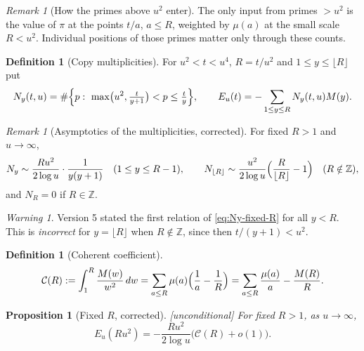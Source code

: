 \documentclass[11pt]{amsart}
\numberwithin{equation}{section}
\theoremstyle{plain}
\newtheorem{proposition}[theorem]{Proposition}
\theoremstyle{definition}
\newtheorem{definition}[theorem]{Definition}
\theoremstyle{remark}
\newtheorem{remark}[theorem]{Remark}
\newtheorem{warning}[theorem]{Warning}
\newcommand{\Cc}{\mathcal{C}}
\begin{document}
\begin{remark}[How the primes above $u^2$ enter]
\label{rem:unknown_primes_enter}
The only input from primes $>u^2$ is the value of $\pi$ at the points $t/a$,
$a\le R$, weighted by $\mu(a)$ at the small scale $R<u^2$. Individual
positions of those primes matter only through these counts.
\end{remark}

\begin{definition}[Copy multiplicities]
\label{def:copy-multiplicity}
For $u^2<t<u^4$, $R=t/u^2$ and $1\le y\le\lfloor R\rfloor$ put
\begin{equation}
\label{eq:Ny-exact}
  N_y(t,u)=\#\Bigl\{p:\ \max\bigl(u^2,\tfrac{t}{y+1}\bigr)<p\le\tfrac ty\Bigr\},
  \qquad
  E_u(t)=-\sum_{1\le y\le R}N_y(t,u)M(y).
\end{equation}
\end{definition}

\begin{remark}[Asymptotics of the multiplicities, corrected]
\label{rem:copy-count-asymptotic}
For fixed $R>1$ and $u\to\infty$,
\begin{equation}
\label{eq:Ny-fixed-R}
  N_y\sim\frac{Ru^2}{2\log u}\cdot\frac1{y(y+1)}\quad(1\le y\le R-1),
  \qquad
  N_{\lfloor R\rfloor}\sim\frac{u^2}{2\log u}\Bigl(\frac R{\lfloor R\rfloor}-1\Bigr)
  \quad(R\notin\mathbb{Z}),
\end{equation}
and $N_R=0$ if $R\in\mathbb{Z}$.
\end{remark}

\begin{warning}
\label{warn:v5_Ny}
Version 5 stated the first relation of \eqref{eq:Ny-fixed-R} for all $y<R$.
This is \emph{incorrect} for $y=\lfloor R\rfloor$ when $R\notin\mathbb{Z}$,
since then $t/(y+1)<u^2$.
\end{warning}

\begin{definition}[Coherent coefficient]
\label{def:coherent_coefficient}
\begin{equation}
\label{eq:C_def}
  \Cc(R):=\int_1^R\frac{M(w)}{w^2}\,dw
  =\sum_{a\le R}\mu(a)\Bigl(\frac1a-\frac1R\Bigr)
  =\sum_{a\le R}\frac{\mu(a)}a-\frac{M(R)}R .
\end{equation}
\end{definition}

\begin{proposition}[Fixed $R$, corrected]
\label{prop:fixed_R_corrected}
\emph{[unconditional]} For fixed $R>1$, as $u\to\infty$,
\begin{equation}
\label{eq:E_fixed_R}
  E_u(Ru^2)=-\frac{Ru^2}{2\log u}\bigl(\Cc(R)+o(1)\bigr).
\end{equation}
\end{proposition}
\end{document}
